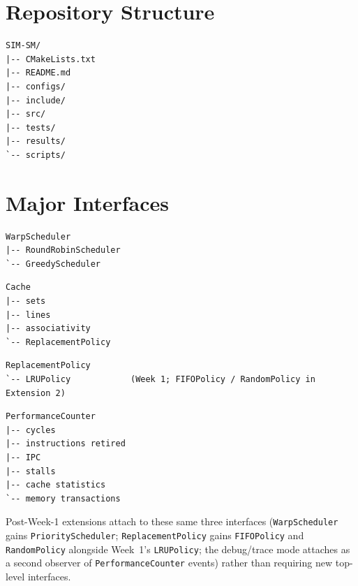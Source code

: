 \documentclass[11pt]{article}
\begin{document}
\section{Repository Structure}

\begin{lstlisting}
SIM-SM/
|-- CMakeLists.txt
|-- README.md
|-- configs/
|-- include/
|-- src/
|-- tests/
|-- results/
`-- scripts/
\end{lstlisting}

\begin{center}
\end{center}

\section{Major Interfaces}

\begin{lstlisting}
WarpScheduler
|-- RoundRobinScheduler
`-- GreedyScheduler
\end{lstlisting}

\begin{lstlisting}
Cache
|-- sets
|-- lines
|-- associativity
`-- ReplacementPolicy
\end{lstlisting}

\begin{lstlisting}
ReplacementPolicy
`-- LRUPolicy            (Week 1; FIFOPolicy / RandomPolicy in Extension 2)
\end{lstlisting}

\begin{lstlisting}
PerformanceCounter
|-- cycles
|-- instructions retired
|-- IPC
|-- stalls
|-- cache statistics
`-- memory transactions
\end{lstlisting}

Post-Week-1 extensions attach to these same three interfaces
(\texttt{WarpScheduler} gains \texttt{PriorityScheduler};
\texttt{ReplacementPolicy} gains \texttt{FIFOPolicy} and
\texttt{RandomPolicy} alongside Week~1's \texttt{LRUPolicy}; the
debug/trace mode attaches as a second observer of
\texttt{PerformanceCounter} events) rather than requiring new top-level
interfaces.
\end{document}
